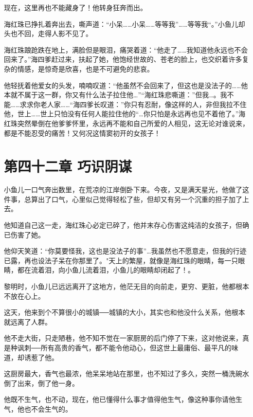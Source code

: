 \documentclass[12pt,oneside]{book}
\begin{document}
现在，这里再也不能藏身了！他转身狂奔而出。

海红珠已挣扎着奔出去，嘶声道：``小呆\ldots\ldots 小呆\ldots\ldots 等等我''\ldots\ldots 等等我``。''小鱼儿却头也不回，走得人影不见了。

海红珠踉跄跌在地上，满脸但是眼泪，痛哭着道：``他走了\ldots\ldots 我知道他永远也不会回来了。''海四爹赶过来，扶起了她，他饱经世故的、苍老的脸上，也交织着许多复杂的情感，是惊奇是欣喜，也是不可避免的悲哀。

他轻抚着他爱女的头发，喃喃叹道：``他虽然不会回来了，但这也是没法子的\ldots\ldots 他本就不属于这一群，你又有什么法子拉住他\ldots{}''``海红珠悲嘶道：''但我\ldots。我不能\ldots\ldots 求求你老人家\ldots\ldots{}``海四爹长叹道：''你只有忍耐，像这样的人，非但我拉不住他，世上\ldots\ldots 世上只怕没有任何人能拉住他的``\ldots 你只怕是永远再也见不着他了。''海红珠突然晕倒在他爹爹怀里，永远再不能和自己所爱的人相见，这无论对谁说来，都是不能忍受的痛苦！又何况这情窦初开的女孩子！

\hypertarget{ux7b2cux56dbux5341ux4e8cux7ae0-ux5de7ux8bc6ux9634ux8c0b}{%
\chapter{第四十二章
巧识阴谋}\label{ux7b2cux56dbux5341ux4e8cux7ae0-ux5de7ux8bc6ux9634ux8c0b}}

小鱼儿一口气奔出数里，在荒凉的江岸倒卧下来。今夜，又是满天星光，他做了这件事，总算出了口气，心里似己觉得轻松了些，但却又有另一个沉重的担子加了上去。

他知道自己这一走，海红珠心必定已碎了，他并末存心伤害这纯洁的女孩子，但确已伤害了她。

他仰天笑道：``你莫要怪我，这也是没法子的事''\ldots 我虽然也不愿意走，但我的行迹已露，再也设法子呆在你那里了。"天上的繁屋，就像是海红珠的眼睛，每一只眼睛，都在流着泪，向小鱼儿流着泪，小鱼儿的眼睛却闭起了！。

黎明时，小鱼儿已远远离开了这地方，他茫无目的向前走，更穷、更脏，他都根本不放在心上。

这天，他来到个不算很小的城镇──城镇的大小，其实也和他没什么关系，他根本就远离了人群。

他不走大街，只走陋巷，他不知不觉在一家厨房的后门停了下来，这对他说来，真是种讽刺──所有高贵的香气，都不能令他动心，但这世上最庸俗、最平凡的味道，却诱惹了他。

这厨房最大，香气也最浓，他呆呆地站在那里，也不知过了多久，突然一桶洗碗水倒了出来，倒了他一身。

他既不生气，也不动，现在，他已懂得什么事才值得他生气，像这种事你请他生气，他也不会生气的。
\end{document}
